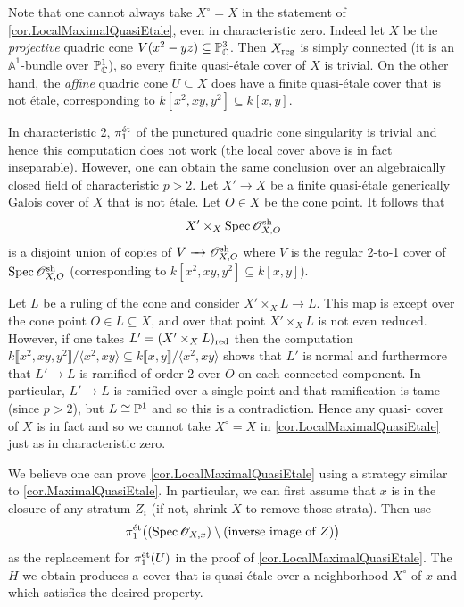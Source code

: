\documentclass[12pt]{amsart}
\numberwithin{equation}{theorem}
\renewcommand{\:}{\colon}
\theoremstyle{theorem}
\def\todo#1{\textcolor{Mahogany}%
{\footnotesize\newline{\color{Mahogany}\fbox{\parbox{\textwidth-15pt}{\textbf{todo:
} #1}}}\newline}}
\renewcommand{\O}{\mathscr O}
\begin{document}
\begin{remark}
Note that one cannot always take $X^{\circ} = X$ in the statement of \autoref{cor.LocalMaximalQuasiEtale}, even in characteristic zero.
Indeed let $X$ be the \emph{projective} quadric cone $V(x^2 - yz) \subseteq \mathbb{P}^3_{\mathbb{C}}$.
Then $X_{\operatorname{{reg}}}$ is simply connected (it is an $\mathbb A^1$-bundle over $\mathbb{P}^1_{\mathbb{C}}$), so every finite quasi-\'etale cover of $X$ is trivial.
On the other hand, the \emph{affine} quadric cone $U \subseteq X$ does have a finite quasi-\'etale cover that is not \'etale, corresponding to $k[x^2, xy, y^2] \subseteq k[x,y]$.

In characteristic 2, $\pi_1^{\textnormal{{\'e}t}}$ of the punctured quadric cone singularity is trivial and hence this computation does not work (the local cover above is in fact inseparable).
However, one can obtain the same conclusion over an algebraically closed field of characteristic $p > 2$.
Let $X' \to X$ be a finite quasi-\'etale generically Galois cover of $X$ that is not \'etale.
Let $O \in X$ be the cone point.
It follows that
\[ X' \times_X \Spec \O_{X, O}^{\sh} \]
is a disjoint union of copies of $V \to \O_{X,O}^{\sh}$ where $V$ is the regular 2-to-1 cover of $\Spec \O_{X, O}^{\sh}$ (corresponding to $k[x^2, xy, y^2] \subseteq k[x,y]$).

Let $L$ be a ruling of the cone and consider $X' \times_X L \to L$.  This map is \etale{} except over the cone point $O \in L \subseteq X$, and over that point $X' \times_X L$ is not even reduced.  However, if one takes $L' = (X' \times_X L)_{\operatorname{red}}$ then the computation $k\llbracket x^2, xy, y^2 \rrbracket/\langle x^2, xy \rangle \subseteq k\llbracket x,y \rrbracket /\langle x^2, xy \rangle$ shows that $L'$ is normal and furthermore that $L' \to L$ is ramified of order 2 over $O$ on each connected component.  In particular, $L' \to L$ is ramified over a single point and that ramification is tame (since $p > 2$), but $L \cong \mathbb{P}^1$ and so this is a contradiction.
Hence any quasi-\etale{} cover of $X$ is in fact \etale{} and so we cannot take $X^{\circ} = X$ in \autoref{cor.LocalMaximalQuasiEtale} just as in characteristic zero.
\end{remark}

\begin{remark}
We believe one can prove \autoref{cor.LocalMaximalQuasiEtale} using a strategy similar to \autoref{cor.MaximalQuasiEtale}.  In particular, we can first assume that $x$ is in the closure of any stratum $Z_i$ (if not, shrink $X$ to remove those strata).  Then use
\[
\pi_1^{\et}\big((\Spec \O_{X,x}) \setminus \text{(inverse image of $Z$)}\big)
\]
as the replacement for $\pi_1^{\textnormal{{\'e}t}}(U)$ in the proof of \autoref{cor.LocalMaximalQuasiEtale}.  The $H$ we obtain produces a cover that is quasi-\'etale over a neighborhood $X^\circ$ of $x$ and which satisfies the desired property.
\end{remark}
\end{document}

